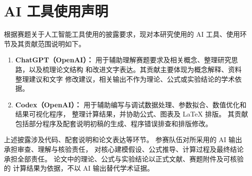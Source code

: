 \documentclass[bwprint]{gmcmthesis}
\numberwithin{equation}{section}
\numberwithin{figure}{section}
\numberwithin{table}{section}
\begin{document}
\endgroup



    \clearpage
    \section*{AI 工具使用声明}

    根据赛题关于人工智能工具使用的披露要求，现对本研究使用的
    AI 工具、使用环节及其贡献范围说明如下。

    \begin{enumerate}
        \item \textbf{ChatGPT（OpenAI）：}
        用于辅助理解赛题要求及相关概念、整理研究思路，以及梳理论文结构
        和改进文字表达。其贡献主要体现为概念解释、资料整理建议和文字
        修改建议，相关输出不作为理论、公式或实验结论的学术依据。
    
        \item \textbf{Codex（OpenAI）：}
        用于辅助编写与调试数据处理、参数拟合、数值优化和结果可视化程序，
        整理计算结果，并协助公式、图表及 \LaTeX{} 排版。
        其贡献包括部分程序及配套说明初稿的生成、程序错误排查和排版修改。
    \end{enumerate}
    
    上述披露涉及代码、配套说明和论文表达等环节。
    参赛队伍对所采用的 AI 输出承担审查、理解与核验责任，
    对核心建模假设、公式推导、计算过程及最终结论承担全部责任。
    论文中的理论、公式与实验结论以正式文献、赛题附件及可核验的
    计算结果为依据，不以 AI 输出替代学术证据。
\end{document}
